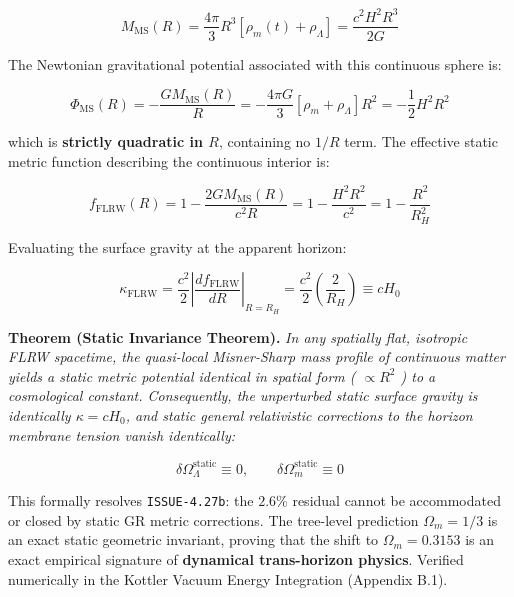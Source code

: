 \documentclass[11pt,a4paper]{article}
\theoremstyle{definition}\newtheorem{definition}{Definition}
\theoremstyle{remark}\newtheorem{remark}{Remark}
\begin{document}
\begin{equation}
M_{\text{MS}}(R) = \frac{4\pi}{3} R^3 [\rho_m(t) + \rho_\Lambda] = \frac{c^2 H^2 R^3}{2 G}
\end{equation}


The Newtonian gravitational potential associated with this continuous sphere is:


\begin{equation}
\Phi_{\text{MS}}(R) = -\frac{G M_{\text{MS}}(R)}{R} = -\frac{4\pi G}{3} [\rho_m + \rho_\Lambda] R^2 = -\frac{1}{2} H^2 R^2
\end{equation}


which is \textbf{strictly quadratic in $R$}, containing no $1/R$ term. The effective static metric function describing the continuous interior is:


\begin{equation}
f_{\text{FLRW}}(R) = 1 - \frac{2 G M_{\text{MS}}(R)}{c^2 R} = 1 - \frac{H^2 R^2}{c^2} = 1 - \frac{R^2}{R_H^2}
\end{equation}


Evaluating the surface gravity at the apparent horizon:


\begin{equation}
\kappa_{\text{FLRW}} = \frac{c^2}{2} \left| \frac{df_{\text{FLRW}}}{dR} \right|_{R = R_H} = \frac{c^2}{2} \left( \frac{2}{R_H} \right) \equiv c H_0
\end{equation}


\textbf{Theorem (Static Invariance Theorem).} \textit{In any spatially flat, isotropic FLRW spacetime, the quasi-local Misner-Sharp mass profile of continuous matter yields a static metric potential identical in spatial form ( $\propto R^2$ ) to a cosmological constant. Consequently, the unperturbed static surface gravity is identically $\kappa = c H_0$, and static general relativistic corrections to the horizon membrane tension vanish identically:}


\begin{equation}
\delta\Omega_\Lambda^{\text{static}} \equiv 0, \qquad \delta\Omega_m^{\text{static}} \equiv 0
\end{equation}


This formally resolves \texttt{ISSUE-4.27b}: the $2.6\%$ residual cannot be accommodated or closed by static GR metric corrections. The tree-level prediction $\Omega_m = 1/3$ is an exact static geometric invariant, proving that the shift to $\Omega_m = 0.3153$ is an exact empirical signature of \textbf{dynamical trans-horizon physics}. Verified numerically in the Kottler Vacuum Energy Integration (Appendix B.1).
\end{document}
